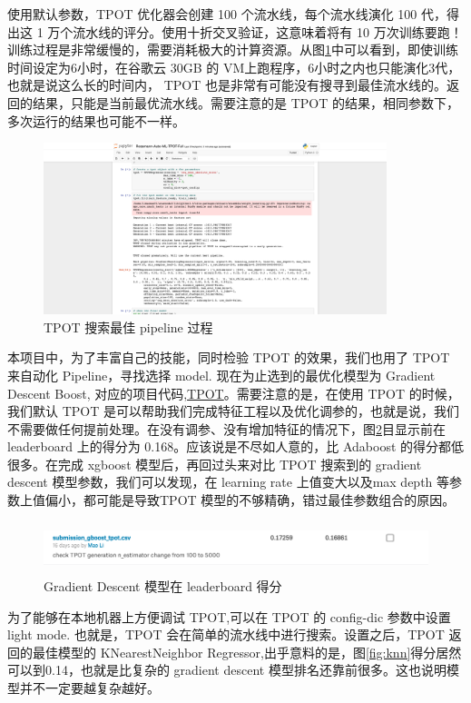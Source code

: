 \documentclass[a4paper]{article}
\begin{document}
使用默认参数，TPOT 优化器会创建 100 个流水线，每个流水线演化 100 代，得出这 1 万个流水线的评分。使用十折交叉验证，这意味着将有 10 万次训练要跑！训练过程是非常缓慢的，需要消耗极大的计算资源。从图\ref{fig:360min}中可以看到，即使训练时间设定为6小时，在谷歌云 30GB 的 VM上跑程序，6小时之内也只能演化3代，也就是说这么长的时间内， TPOT 也是非常有可能没有搜寻到最佳流水线的。返回的结果，只能是当前最优流水线。需要注意的是 TPOT 的结果，相同参数下，多次运行的结果也可能不一样。
\begin{figure}[ht]
 \centering
 \includegraphics[height=5cm]{images/360min}
 \caption{TPOT 搜索最佳 pipeline 过程}
 \label{fig:360min}
\end{figure}

本项目中，为了丰富自己的技能，同时检验 TPOT 的效果，我们也用了 TPOT 来自动化 Pipeline，寻找选择 model. 现在为止选到的最优化模型为 Gradient Descent Boost, 对应的项目代码,\href{https://github.com/lidatou1991/udacity_final_rossmann/blob/master/Rossmann-Auto-ML-TPOT-Full.ipynb}{TPOT}。需要注意的是，在使用 TPOT 的时候，我们默认 TPOT 是可以帮助我们完成特征工程以及优化调参的，也就是说，我们不需要做任何提前处理。在没有调参、没有增加特征的情况下，图\ref{fig:tpot-gd}目显示前在 leaderboard 上的得分为 0.168。应该说是不尽如人意的，比 Adaboost 的得分都低很多。在完成 xgboost 模型后，再回过头来对比 TPOT 搜索到的 gradient descent 模型参数，我们可以发现，在 learning rate 上值变大以及max depth 等参数上值偏小，都可能是导致TPOT 模型的不够精确，错过最佳参数组合的原因。
\begin{figure}[ht]
 \centering
 \includegraphics[height=1.5cm,width=\textwidth]{images/tpot-gd-168}
 \caption{Gradient Descent 模型在 leaderboard 得分}
 \label{fig:tpot-gd}
\end{figure}

为了能够在本地机器上方便调试 TPOT,可以在 TPOT 的 config-dic 参数中设置 light mode. 也就是，TPOT 会在简单的流水线中进行搜索。设置之后，TPOT 返回的最佳模型的 KNearestNeighbor Regressor,出乎意料的是，图\ref{fig:knn}得分居然可以到0.14，也就是比复杂的 gradient descent 模型排名还靠前很多。这也说明模型并不一定要越复杂越好。
\end{document}
